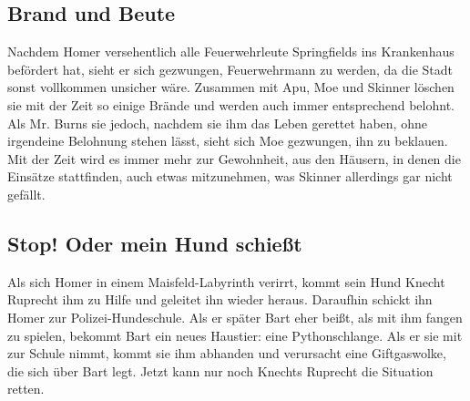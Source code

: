 
\subsection{Brand und Beute}\label{JABF13}
Nachdem Homer versehentlich alle Feuerwehrleute Springfields ins Krankenhaus befördert hat, sieht er sich gezwungen, Feuerwehrmann zu werden, da die Stadt sonst vollkommen unsicher wäre. Zusammen mit Apu, Moe und Skinner löschen sie mit der Zeit so einige Brände und werden auch immer entsprechend belohnt. Als Mr. Burns sie jedoch, nachdem sie ihm das Leben gerettet haben, ohne irgendeine Belohnung stehen lässt, sieht sich Moe gezwungen, ihn zu beklauen. Mit der Zeit wird es immer mehr zur Gewohnheit, aus den Häusern, in denen die Einsätze stattfinden, auch etwas mitzunehmen, was Skinner allerdings gar nicht gefällt.



\subsection{Stop! Oder mein Hund schießt}
Als sich Homer in einem Maisfeld-Labyrinth verirrt, kommt sein Hund Knecht Ruprecht ihm zu Hilfe und geleitet ihn wieder heraus. Daraufhin schickt ihn Homer zur Polizei-Hundeschule. Als er später Bart eher beißt, als mit ihm fangen zu spielen, bekommt Bart ein neues Haustier: eine Pythonschlange. Als er sie mit zur Schule nimmt, kommt sie ihm abhanden und verursacht eine Giftgaswolke, die sich über Bart legt. Jetzt kann nur noch Knechts Ruprecht die Situation retten.

